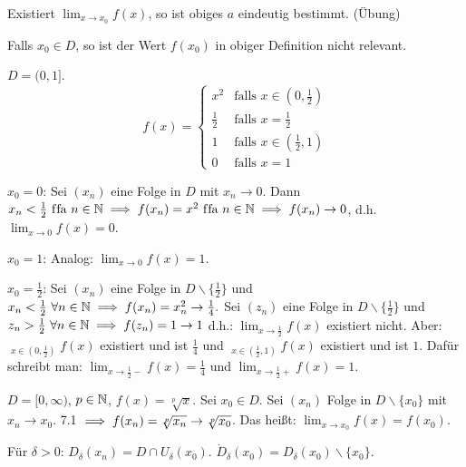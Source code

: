 \documentclass[a4paper,twoside,DIV15,BCOR12mm]{scrbook}
\begin{document}
\begin{bemerkung}
\begin{liste}
\item Existiert $\displaystyle\lim_{x\to x_0}f(x)$, so ist obiges $a$ eindeutig bestimmt. (Übung)
\item Falls $x_0 \in D$, so ist der Wert $f(x_0)$ in obiger Definition nicht relevant.
\end{liste}
\end{bemerkung}

\begin{beispiele}
\item $D= (0,1]$. $$f(x) = \begin{cases} x^2 & \text{falls }x\in(0,\frac{1}{2}) \\ \frac{1}{2} & \text{falls }x=\frac{1}{2} \\ 1 & \text{falls } x \in(\frac{1}{2},1) \\ 0 & \text{falls } x= 1\end{cases}$$

$x_0=0$: Sei $(x_n)$ eine Folge in $D$ mit $x_n \to 0$. Dann $x_n < \frac{1}{2} \text{ f\/fa } n\in\mathbb{N} \implies f(x_n) = x^2 \text{ f\/fa } n\in\mathbb{N} \implies f(x_n) \to 0$, d.h. $\displaystyle\lim_{x\to0}f(x) = 0$.

$x_0 = 1$: Analog: $\displaystyle\lim_{x\to0}f(x) = 1$.

$x_0= \frac{1}{2}$: Sei $(x_n)$ eine Folge in $D\backslash\{\frac{1}{2}\}$ und $x_n < \frac{1}{2} \ \forall n\in\mathbb{N} \implies f(x_n) = x_n^2 \to \frac{1}{4}.$
Sei $(z_n)$ eine Folge in $D\backslash\{\frac{1}{2}\}$ und $z_n > \frac{1}{2} \ \forall n\in\mathbb{N} \implies f(z_n) = 1 \to 1$
d.h.: $\displaystyle\lim_{x\to\frac{1}{2}}f(x)$ existiert nicht. Aber: $\displaystyle\mathop{\lim_{x\to\frac{1}{2}}}_{x\in(0,\frac{1}{2})} f(x)$ existiert und ist $\frac{1}{4}$ und $\displaystyle\mathop{\lim_{x\to\frac{1}{2}}}_{x\in(\frac{1}{2},1)} f(x)$ existiert und ist $1$. Dafür schreibt man: $\displaystyle\lim_{x\to\frac{1}{2}-} f(x)=\frac{1}{4}$ und $\displaystyle\lim_{x\to\frac{1}{2}+} f(x)=1$.

\item $D=[0,\infty)$, $p\in\mathbb{N}$, $f(x) = \sqrt[p]{x}$. Sei $x_0 \in D$. Sei $(x_n)$ Folge in $D\backslash\{x_0\}$ mit $x_n \to x_0$. 7.1 $\implies f(x_n)=\sqrt[p]{x_n} \to \sqrt[p]{x_0}$. Das heißt: $\displaystyle\lim_{x\to x_0 } f(x) = f(x_0)$.
\end{beispiele}

\begin{vereinbarung}
Für $\delta >0$: $D_\delta(x_n) = D \cap U_\delta(x_0)$. $\dot D_\delta(x_0) = D_\delta(x_0) \backslash \{x_0\}$.
\end{vereinbarung}
\end{document}
